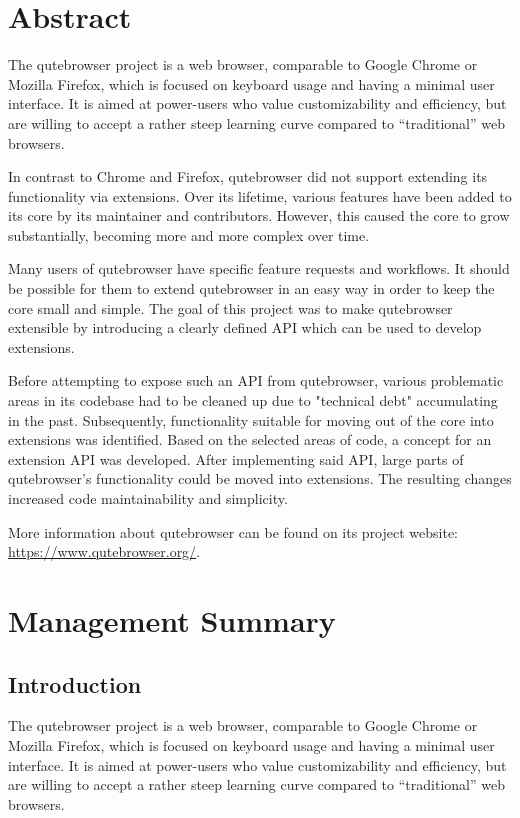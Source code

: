 
\chapter*{Abstract}
The qutebrowser project is a web browser, comparable to Google Chrome or Mozilla
Firefox, which is focused on keyboard usage and having a minimal user interface.
It is aimed at power-users who value customizability and efficiency, but are
willing to accept a rather steep learning curve compared to ``traditional'' web
browsers.

In contrast to Chrome and Firefox, qutebrowser did not support extending its
functionality via extensions. Over its lifetime, various features have been
added to its core by its maintainer and contributors. However, this caused the
core to grow substantially, becoming more and more complex over time.

Many users of qutebrowser have specific feature requests and workflows. It
should be possible for them to extend qutebrowser in an easy way in order to
keep the core small and simple. The goal of this project was to make qutebrowser
extensible by introducing a clearly defined API which can be used to develop
extensions.

Before attempting to expose such an API from qutebrowser, various problematic
areas in its codebase had to be cleaned up due to "technical debt" accumulating
in the past. Subsequently, functionality suitable for moving out of the core
into extensions was identified. Based on the selected areas of code, a concept
for an extension API was developed. After implementing said API, large parts of
qutebrowser's functionality could be moved into extensions. The resulting
changes increased code maintainability and simplicity.

More information about qutebrowser can be found on its project website: \\ \url{https://www.qutebrowser.org/}.

\chapter*{Management Summary}
\section*{Introduction}
The qutebrowser project is a web browser, comparable to Google Chrome or Mozilla
Firefox, which is focused on keyboard usage and having a minimal user
interface. It is aimed at power-users who value customizability and efficiency,
but are willing to accept a rather steep learning curve compared to
``traditional'' web browsers.

